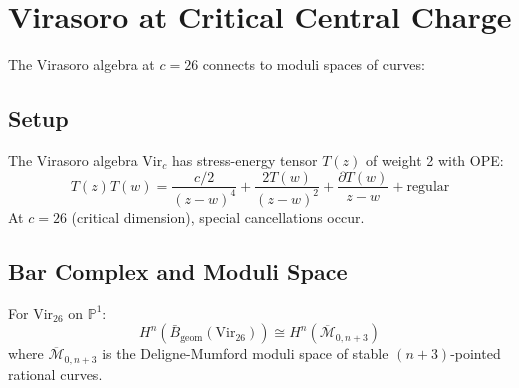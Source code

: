 \section{Virasoro at Critical Central Charge}
 
The Virasoro algebra at $c = 26$ connects to moduli spaces of curves:
 
\subsection{Setup}
 
\begin{definition}
The Virasoro algebra $\text{Vir}_c$ has stress-energy tensor $T(z)$ of weight 2 with OPE:
\[
T(z)T(w) = \frac{c/2}{(z-w)^4} + \frac{2T(w)}{(z-w)^2} + \frac{\partial T(w)}{z-w} + \text{regular}
\]
At $c = 26$ (critical dimension), special cancellations occur.
\end{definition}
 
\subsection{Bar Complex and Moduli Space}
 
\begin{theorem}\label{thm:virasoro-moduli}
For $\text{Vir}_{26}$ on $\mathbb{P}^1$:
\[
H^n(\bar{B}_{\text{geom}}(\text{Vir}_{26})) \cong H^n(\overline{\mathcal{M}}_{0,n+3})
\]
where $\overline{\mathcal{M}}_{0,n+3}$ is the Deligne-Mumford moduli space of stable $(n+3)$-pointed rational curves.
\end{theorem}
 
